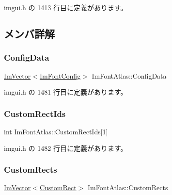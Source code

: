  imgui.\+h の 1413 行目に定義があります。



\subsection{メンバ詳解}
\mbox{\label{struct_im_font_atlas_afa4f7459807763d032fe2d0022fc0823}} 
\subsubsection{\texorpdfstring{Config\+Data}{ConfigData}}
{\footnotesize\ttfamily \mbox{\hyperlink{class_im_vector}{Im\+Vector}}$<$\mbox{\hyperlink{struct_im_font_config}{Im\+Font\+Config}}$>$ Im\+Font\+Atlas\+::\+Config\+Data}



 imgui.\+h の 1481 行目に定義があります。

\mbox{\label{struct_im_font_atlas_a608ad12c2ccf1eed97b63454e52ccbe8}} 
\subsubsection{\texorpdfstring{Custom\+Rect\+Ids}{CustomRectIds}}
{\footnotesize\ttfamily int Im\+Font\+Atlas\+::\+Custom\+Rect\+Ids\mbox{[}1\mbox{]}}



 imgui.\+h の 1482 行目に定義があります。

\mbox{\label{struct_im_font_atlas_a6289931d958f734fdc2ac1fadec99577}} 
\subsubsection{\texorpdfstring{Custom\+Rects}{CustomRects}}
{\footnotesize\ttfamily \mbox{\hyperlink{class_im_vector}{Im\+Vector}}$<$\mbox{\hyperlink{struct_im_font_atlas_1_1_custom_rect}{Custom\+Rect}}$>$ Im\+Font\+Atlas\+::\+Custom\+Rects}



